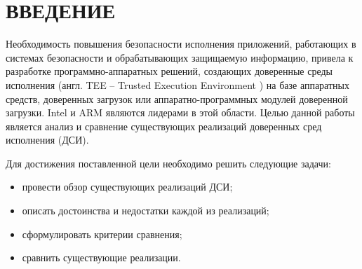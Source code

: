 \section*{ВВЕДЕНИЕ}

Необходимость повышения безопасности исполнения приложений, работающих в системах безопасности и обрабатывающих защищаемую информацию, привела к разработке программно-аппаратных решений, создающих доверенные среды исполнения (англ. TEE -- Trusted Execution Environment \cite{tee}) на базе аппаратных средств, доверенных загрузок или аппаратно-программных модулей доверенной загрузки. Intel \cite{intel} и ARM \cite{arm} являются лидерами в этой области. Целью данной работы является анализ и сравнение существующих реализаций доверенных сред исполнения (ДСИ).

Для достижения поставленной цели необходимо решить следующие задачи:

\begin{itemize}
	\item провести обзор существующих реализаций ДСИ;
	\item описать достоинства и недостатки каждой из реализаций;
	\item сформулировать критерии сравнения;
	\item сравнить существующие реализации.
\end{itemize}

\pagebreak
